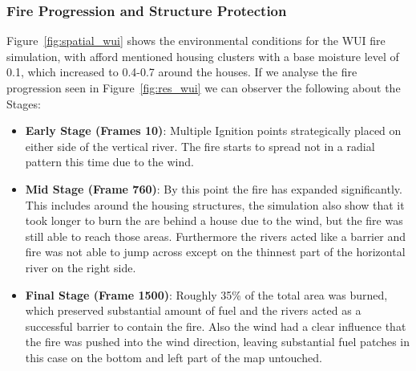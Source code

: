 \subsubsection{Fire Progression and Structure Protection}
Figure~\ref{fig:spatial_wui} shows the environmental conditions for the WUI fire simulation, with afford mentioned housing clusters with a base moisture level of 0.1, which increased to 0.4-0.7 around the houses.\newline
If we analyse the fire progression seen in Figure~\ref{fig:res_wui} we can observer the following about the Stages:
\begin{itemize}
	\item \textbf{Early Stage (Frames 10)}: Multiple Ignition points strategically placed on either side of the vertical river. The fire starts to spread not in a radial pattern this time due to the wind.
	\item \textbf{Mid Stage (Frame 760)}: By this point the fire has expanded significantly. This includes around the housing structures, the simulation also show that it took longer to burn the are behind a house due to the wind, but the fire was still able to reach those areas. Furthermore the rivers acted like a barrier and fire was not able to jump across except on the thinnest part of the horizontal river on the right side.
	\item \textbf{Final Stage (Frame 1500)}: Roughly 35\% of the total area was burned, which preserved substantial amount of fuel and the rivers acted as a successful barrier to contain the fire. Also the wind had a clear influence that the fire was pushed into the wind direction, leaving substantial fuel patches in this case on the bottom and left part of the map untouched.
\end{itemize}

